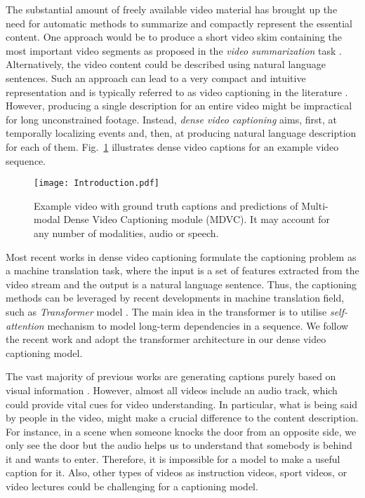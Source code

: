 \documentclass[10pt,twocolumn,letterpaper]{article}
\begin{document}
The substantial amount of freely available video material has brought up the need for automatic methods to summarize and compactly represent the essential content. One approach would be to produce a short video skim containing the most important video segments as proposed in the \textit{video summarization} task \cite{Lee2012}. Alternatively, the video content could be described using natural language sentences. Such an approach can lead to a very compact and intuitive representation and is typically referred to as video captioning in the literature \cite{Yu2016}. However, producing a single description for an entire video might be impractical for long unconstrained footage. Instead, \textit{dense video captioning} \cite{Krishna2017} aims, first, at temporally localizing events and, then, at producing natural language description for each of them. Fig.~\ref{fig:intro} illustrates dense video captions for an example video sequence.

\begin{figure}[t]
\begin{center}
   \texttt{[image: Introduction.pdf]}
\end{center}
   \caption{Example video with ground truth captions and predictions of Multi-modal Dense Video Captioning module (MDVC). It may account for any number of modalities, \ie audio or speech.\label{fig:intro}}
\end{figure}

Most recent works in dense video captioning formulate the captioning problem as a machine translation task, where the input is a set of features extracted from the video stream and the output is a natural language sentence. Thus, the captioning methods can be leveraged by recent developments in machine translation field, such as \textit{Transformer} model \cite{Vaswani2017}. The main idea in the transformer is to utilise \textit{self-attention} mechanism to model long-term dependencies in a sequence. We follow the recent work \cite{Zhou2018} and adopt the transformer architecture in our dense video captioning model. 

The vast majority of previous works are generating captions purely based on visual information \cite{Zhou2018,Wang2018n,Li2018,Ma2018,Xiong2018,Mun2019,Xu2019}. However, almost all videos include an audio track, which could provide vital cues for video understanding. In particular, what is being said by people in the video, might make a crucial difference to the content description. For instance, in a scene when someone knocks the door from an opposite side, we only see the door but the audio helps us to understand that somebody is behind it and wants to enter. Therefore, it is impossible for a model to make a useful caption for it. Also, other types of videos as instruction videos, sport videos, or video lectures could be challenging for a captioning model. 
\end{document}
